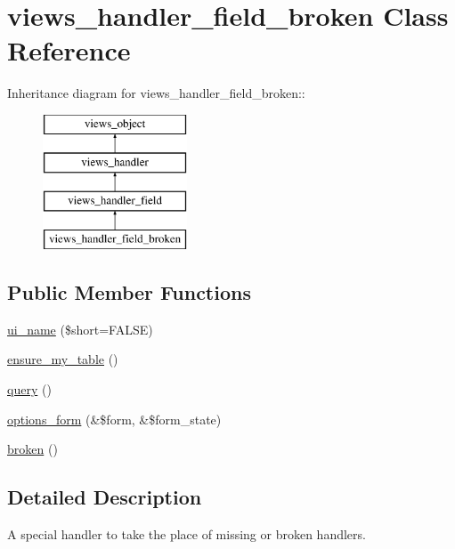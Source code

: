\hypertarget{classviews__handler__field__broken}{
\section{views\_\-handler\_\-field\_\-broken Class Reference}
\label{classviews__handler__field__broken}
}
Inheritance diagram for views\_\-handler\_\-field\_\-broken::\begin{figure}[H]
\begin{center}
\leavevmode
\includegraphics[height=4cm]{classviews__handler__field__broken}
\end{center}
\end{figure}
\subsection*{Public Member Functions}
\begin{CompactItemize}
\item 
\hyperlink{classviews__handler__field__broken_0b3272926656e5fc3f6c011fa51746ed}{ui\_\-name} (\$short=FALSE)
\item 
\hyperlink{classviews__handler__field__broken_887902026800149644e827fbb92dba15}{ensure\_\-my\_\-table} ()
\item 
\hyperlink{classviews__handler__field__broken_f6665205257b9b0e1dce732645f5dde1}{query} ()
\item 
\hyperlink{classviews__handler__field__broken_fc66860f4fb5a1878a131c30500e6e1d}{options\_\-form} (\&\$form, \&\$form\_\-state)
\item 
\hyperlink{classviews__handler__field__broken_f579634a7ec51fa709d7c0cddc135725}{broken} ()
\end{CompactItemize}


\subsection{Detailed Description}
A special handler to take the place of missing or broken handlers. 

